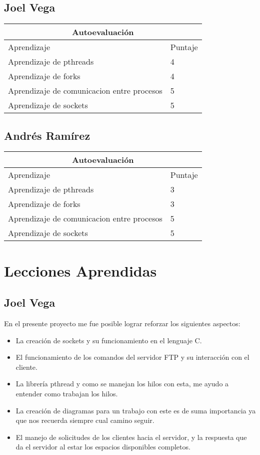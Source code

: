 \documentclass[a4paper,12pt,twoside]{article}
\begin{document}
\subsection{Joel Vega}
\begin{tabular}{ |p{3cm}||p{3cm} }
 \hline
 \multicolumn{2}{|c|}{Autoevaluación} \\
 \hline
 Aprendizaje       & Puntaje\\
 \hline
Aprendizaje de pthreads   & 4 \\
 \hline
Aprendizaje de forks   & 4   \\
 \hline
Aprendizaje de comunicacion entre procesos   & 5 \\
 \hline
Aprendizaje de sockets   & 5 \\

 \hline
\end{tabular}

\subsection{Andrés Ramírez}

\begin{tabular}{ |p{3cm}||p{3cm} }
 \hline
 \multicolumn{2}{|c|}{Autoevaluación} \\
 \hline
 Aprendizaje       & Puntaje\\
 \hline
Aprendizaje de pthreads   & 3 \\
 \hline
Aprendizaje de forks   & 3   \\
 \hline
Aprendizaje de comunicacion entre procesos   & 5 \\
 \hline
Aprendizaje de sockets   & 5 \\

 \hline
\end{tabular}


\newpage
\section{Lecciones Aprendidas}
\subsection{Joel Vega}

En el presente proyecto me fue posible lograr reforzar los siguientes aspectos:
\begin{itemize}
    \item La creación de sockets y su funcionamiento en el lenguaje C.
    \item El funcionamiento de los comandos del servidor FTP y su interacción con el cliente.
    \item La librería pthread y como se manejan los hilos con esta, me ayudo a entender como trabajan los hilos.
    \item La creación de diagramas para un trabajo con este es de suma importancia ya que nos recuerda siempre cual camino seguir.
    \item El manejo de solicitudes de los clientes hacia el servidor, y la respuesta que da el servidor al estar los espacios disponibles completos.
\end{itemize}
\end{document}
